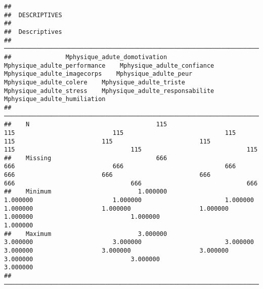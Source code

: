 \documentclass[
]{article}
\begin{document}
\begin{verbatim}
## 
##  DESCRIPTIVES
## 
##  Descriptives                                                                                                                                                                                                                                                                                                          
##  ───────────────────────────────────────────────────────────────────────────────────────────────────────────────────────────────────────────────────────────────────────────────────────────────────────────────────────────────────────────────────────────────────────────────────────────────────────────────────── 
##               Mphysique_adute_domotivation    Mphysique_adulte_performance    Mphysique_adulte_confiance    Mphysique_adulte_imagecorps    Mphysique_adulte_peur    Mphysique_adulte_colere    Mphysique_adulte_triste    Mphysique_adulte_stress    Mphysique_adulte_responsabilite    Mphysique_adulte_humiliation   
##  ───────────────────────────────────────────────────────────────────────────────────────────────────────────────────────────────────────────────────────────────────────────────────────────────────────────────────────────────────────────────────────────────────────────────────────────────────────────────────── 
##    N                                   115                             115                           115                            115                      115                        115                        115                        115                                115                             115   
##    Missing                             666                             666                           666                            666                      666                        666                        666                        666                                666                             666   
##    Minimum                        1.000000                        1.000000                      1.000000                       1.000000                 1.000000                   1.000000                   1.000000                   1.000000                           1.000000                        1.000000   
##    Maximum                        3.000000                        3.000000                      3.000000                       3.000000                 3.000000                   3.000000                   3.000000                   3.000000                           3.000000                        3.000000   
##  ─────────────────────────────────────────────────────────────────────────────────────────────────────────────────────────────────────────────────────────────────────────────────────────────────────────────────────────────────────────────────────────────────────────────────────────────────────────────────────
\end{verbatim}
\end{document}

